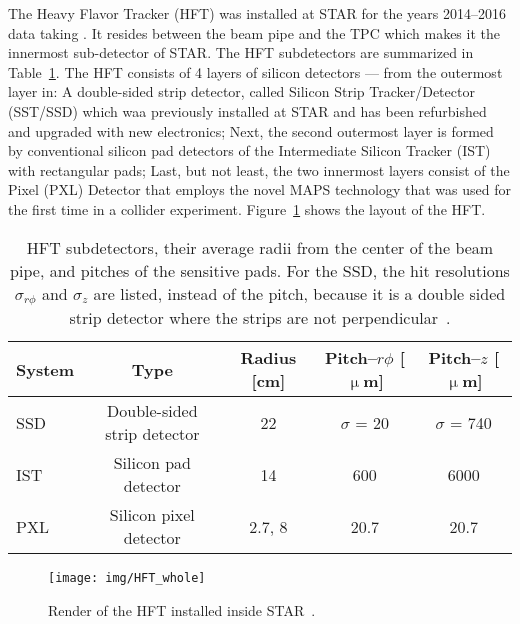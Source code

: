 The Heavy Flavor Tracker (HFT) was installed at STAR for the years 2014--2016 data 
taking \cite{HftTdr, HFTLeo, HftFinal}. It resides between the beam pipe and the TPC which makes it the innermost 
sub-detector of STAR\@. The 
HFT
subdetectors are summarized in Table~\ref{HFTtab}\@. The HFT consists of 4
layers of silicon detectors --- from the outermost layer in: A double-sided strip detector, called Silicon Strip
Tracker/Detector
(SST/SSD) which waa previously installed at STAR and has been
refurbished and upgraded with new electronics; Next, the second outermost layer is formed by conventional silicon 
pad detectors
of the Intermediate Silicon Tracker (IST) 
with rectangular pads; Last, but not least, the two innermost layers consist of the Pixel (PXL) 
Detector
that employs the novel MAPS technology that was used for the first time in a collider experiment. Figure~\ref{HFT_whole} shows the layout of the HFT\@.


\begin{table}[!htb]
\caption[HFT subdetectors.]{\label{HFTtab}HFT subdetectors, their average radii from the center of the beam pipe, and pitches of the sensitive pads. For the SSD, the hit resolutions $\sigma_{r\phi}$ and $\sigma_z$ are listed, instead of the pitch, because it is a double sided strip detector where the strips are not perpendicular~\cite{HftTdr}.}
\begin{center}
\begin{tabular}{lcccc}
\toprule
System & Type & Radius [cm] & Pitch--$r\phi$ [$\upmu$m] & Pitch--$z$ [$\upmu$m]\\
\midrule
SSD & Double-sided strip detector & 22 & $\sigma$ = 20 & $\sigma$ = 740 \\
IST & Silicon pad detector & 14 & 600 & 6000 \\
PXL & Silicon pixel detector & 2.7, 8 & 20.7 & 20.7 \\
\bottomrule
\end{tabular}
\end{center}
\end{table}

\begin{figure}[!htb]
\begin{center}
 \texttt{[image: img/HFT\_whole]}\\
\end{center}
\caption[Render of the HFT installed inside STAR.]{\label{HFT_whole}Render of the HFT installed inside STAR~\cite{HftTdr}\@.}
\end{figure}




